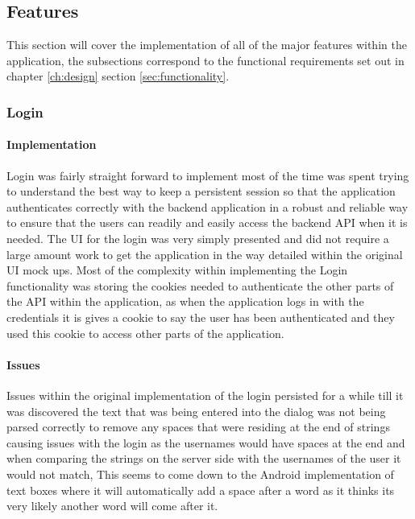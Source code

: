 \subsection{Features}

This section will cover the implementation of all of the major features within the application, the subsections correspond to the functional requirements set out in chapter \ref{ch:design} section \ref{sec:functionality}.

\subsubsection*{Login}

\paragraph*{Implementation}

Login was fairly straight forward to implement most of the time was spent trying to understand the best way to keep a persistent session so that the application authenticates correctly with the backend application in a robust and reliable way to ensure that the users can readily and easily access the backend API when it is needed. The UI for the login was very simply presented and did not require a large amount work to get the application in the way detailed within the original UI mock ups. Most of the complexity within implementing the Login functionality was storing the cookies needed to authenticate the other parts of the API within the application, as when the application logs in with the credentials it is gives a cookie to say the user has been authenticated and they used this cookie to access other parts of the application.

\paragraph*{Issues}

Issues within the original implementation of the login persisted for a while till it was discovered the text that was being entered into the dialog was not being parsed correctly to remove any spaces that were residing at the end of strings causing issues with the login as the usernames would have spaces at the end and when comparing the strings on the server side with the usernames of the user it would not match, This seems to come down to the Android implementation of text boxes where it will automatically add a space after a word as it thinks its very likely another word will come after it.


